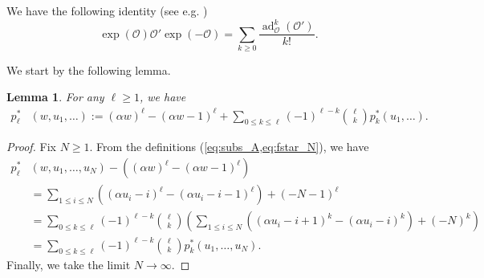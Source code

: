 \documentclass[12pt]{amsart}
\newtheorem{lem}[thm]{Lemma}
\theoremstyle{remark}
\DeclareMathOperator{\ad}{ad}
\newcommand{\mcO}{\mathcal{O}}
\begin{document}
We have the following identity (see e.g. \cite{Wilcox1967})
\begin{equation}\label{eq:e^ad}
  \exp(\mcO)\mcO'\exp(-\mcO)=\sum_{k\geq0}\frac{\ad^k_\mcO(\mcO')}{k!}.  
\end{equation}
    
We start by the following lemma.
\begin{lem}\label{lem:shift}
For any $\ell\geq 1$, we have
   \begin{align*}
 p_\ell^*&(w,u_1,\dots):=(\alpha w)^\ell-(\alpha w-1)^\ell+\sum_{0\leq k\leq \ell}(-1)^{\ell-k}\binom{\ell}{k}p^*_{k}(u_1,\dots).
\end{align*}
\end{lem}
\begin{proof}
Fix $N\geq 1$. From the definitions (\cref{eq:subs_A,eq:fstar_N}),  we have
    \begin{align*}
 p_\ell^*&(w,u_1,\dots,u_N)-\left((\alpha w)^\ell-(\alpha w-1)^\ell\right)\\
 &=\sum_{1\leq i\leq N}\left((\alpha u_i-i)^\ell-(\alpha u_i-i-1)^\ell\right)+(-N-1)^\ell\\
 &=\sum_{0\leq k\leq \ell}(-1)^{\ell-k}\binom{\ell}{k}\left(\sum_{1\leq i\leq N}\left((\alpha u_i-i+1)^k-(\alpha u_i-i)^k\right)+(-N)^k\right)\\
 &=\sum_{0\leq k\leq \ell}(-1)^{\ell-k}\binom{\ell}{k}p^*_{k}(u_1,\dots,u_N).
\end{align*}
Finally, we take the limit $N\rightarrow\infty.$
\end{proof}
\end{document}

